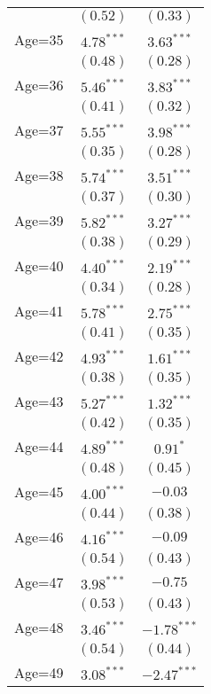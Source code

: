 \documentclass[fullpage]{paper}
\begin{document}
\begin{center}
\begin{longtable}{l c c }
            & $(0.52)$      & $(0.33)$      \\
Age=35      & $4.78^{***}$  & $3.63^{***}$  \\
            & $(0.48)$      & $(0.28)$      \\
Age=36      & $5.46^{***}$  & $3.83^{***}$  \\
            & $(0.41)$      & $(0.32)$      \\
Age=37      & $5.55^{***}$  & $3.98^{***}$  \\
            & $(0.35)$      & $(0.28)$      \\
Age=38      & $5.74^{***}$  & $3.51^{***}$  \\
            & $(0.37)$      & $(0.30)$      \\
Age=39      & $5.82^{***}$  & $3.27^{***}$  \\
            & $(0.38)$      & $(0.29)$      \\
Age=40      & $4.40^{***}$  & $2.19^{***}$  \\
            & $(0.34)$      & $(0.28)$      \\
Age=41      & $5.78^{***}$  & $2.75^{***}$  \\
            & $(0.41)$      & $(0.35)$      \\
Age=42      & $4.93^{***}$  & $1.61^{***}$  \\
            & $(0.38)$      & $(0.35)$      \\
Age=43      & $5.27^{***}$  & $1.32^{***}$  \\
            & $(0.42)$      & $(0.35)$      \\
Age=44      & $4.89^{***}$  & $0.91^{*}$    \\
            & $(0.48)$      & $(0.45)$      \\
Age=45      & $4.00^{***}$  & $-0.03$       \\
            & $(0.44)$      & $(0.38)$      \\
Age=46      & $4.16^{***}$  & $-0.09$       \\
            & $(0.54)$      & $(0.43)$      \\
Age=47      & $3.98^{***}$  & $-0.75$       \\
            & $(0.53)$      & $(0.43)$      \\
Age=48      & $3.46^{***}$  & $-1.78^{***}$ \\
            & $(0.54)$      & $(0.44)$      \\
Age=49      & $3.08^{***}$  & $-2.47^{***}$ \\

\end{longtable}
\end{center}
\end{document}

